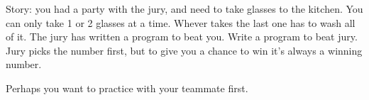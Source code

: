Story: you had a party with the jury, and need to take glasses to the kitchen. You can only take 1 or 2 glasses at a time. Whever takes the last one has to wash all of it. The jury has written a program to beat you. Write a program to beat jury. Jury picks the number first, but to give you a chance to win it's always a winning number.

Perhaps you want to practice with your teammate first.
